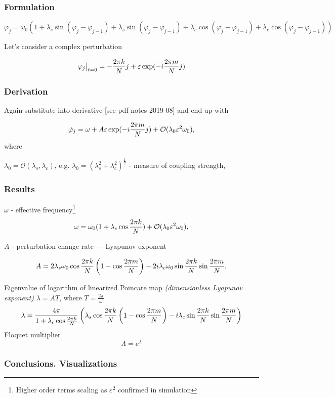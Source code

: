 \documentclass[a4paper,12pt]{article}
\newcommand{\eps}{\varepsilon}
\newcommand{\bigO}{\mathcal{O}}
\begin{document}
\subsubsection{Formulation}


\begin{equation}
\dot \varphi_j = \omega_0 \left( 1 + \lambda_s \sin(\varphi_j - \varphi_{j-1})
+ \lambda_s \sin(\varphi_j - \varphi_{j-1})
+ \lambda_c \cos(\varphi_j - \varphi_{j-1})
+ \lambda_c \cos(\varphi_j - \varphi_{j-1}) \right)
\label{eqn:dphidt-sin-cos}
\end{equation}

Let's consider a complex perturbation

$$
\varphi_j \big\rvert_{t=0} = - \fr{k}{j} + \eps \exp( - i \fr{m}{j})
$$

\subsubsection{Derivation}

Again substitute into derivative [see pdf notes 2019-08] and end up with

$$
\dot \varphi_j = \omega + A \eps \exp(- i \fr{m}{j}) + \bigO(\lambda_0 \eps ^ 2 \omega_0),
$$
where 

$\lambda_0 = \bigO(\lambda_s, \lambda_c)$, e.g. $\lambda_0 = \left( \lambda_s^2 + \lambda_c^2 \right)^{\frac{1}{2}}$ - measure of coupling strength,


\subsubsection{Results}

$\omega$ - effective frequency\footnote{Higher order terms scaling as $\eps ^2$ confirmed in simulation}
$$
 \omega = \omega_0 (1 + \lambda_c \co{k}{}) + \bigO(\lambda_0 \eps^2 \omega_0 ),
$$

$A$ - perturbation change rate --- Lyapunov exponent

$$ 
A = 
 2 \lambda_s \omega_0 \cos \frac{2 \pi k} {N}  \left(1 - \cos \frac{2 \pi m} {N}  \right)
- 2 i \lambda_c \omega_0 \sin \frac{2 \pi k} {N}  \sin \frac{2 \pi m} {N} ,
$$

Eigenvalue of logarithm of linearized Poincare map \textit{(dimensionless Lyapunov exponent)} $\lambda = A T$, where $T = \frac{2 \pi}{\omega}$
$$
\lambda
=\frac{4 \pi} {1 + \lambda_c \cos \frac{2 \pi k} {N} } \left(  \lambda_s \cos \frac{2 \pi k} {N}  \left(1 - \cos \frac{2 \pi m} {N}  \right)
-  i \lambda_c \sin \frac{2 \pi k} {N}  \sin \frac{2 \pi m} {N}  \right) 
$$
Floquet multiplier
$$ 
\Lambda = e^{\lambda}
$$

\subsubsection{Conclusions. Visualizations}
\end{document}
